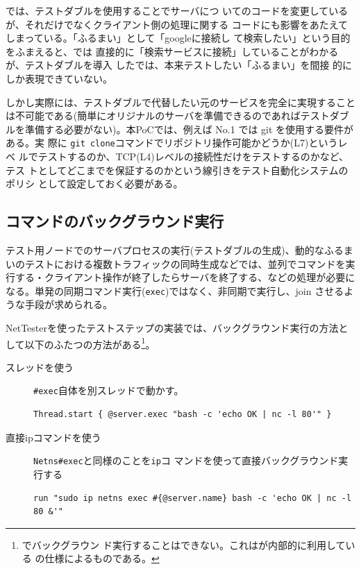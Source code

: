 では、テストダブルを使用することでサーバにつ
いてのコードを変更しているが、それだけでなくクライアント側の処理に関する
コードにも影響をあたえてしまっている。「ふるまい」として「googleに接続し
て検索したい」という目的をふまえると、では
直接的に「検索サービスに接続」していることがわかるが、テストダブルを導入
したでは、本来テストしたい「ふるまい」を間接
的にしか表現できていない。

しかし実際には、テストダブルで代替したい元のサービスを完全に実現すること
は不可能である(簡単にオリジナルのサーバを準備できるのであればテストダブ
ルを準備する必要がない)。本PoCでは、例えば
 No.1 では git を使用する要件がある。実
際に \verb|git clone|コマンドでリポジトリ操作可能かどうか(L7)というレベ
ルでテストするのか、TCP(L4)レベルの接続性だけをテストするのかなど、テス
トとしてどこまでを保証するのかという線引きをテスト自動化システムのポリシ
として設定しておく必要がある。

  \subsection{コマンドのバックグラウンド実行}
  \label{sec:background-exec-method}

テスト用ノードでのサーバプロセスの実行(テストダブルの生成)、動的なふるま
いのテストにおける複数トラフィックの同時生成などでは、並列でコマンドを実
行する・クライアント操作が終了したらサーバを終了する、などの処理が必要に
なる。単発の同期コマンド実行(\verb|exec|)ではなく、非同期で実行し、join
させるような手段が求められる。

NetTesterを使ったテストステップの実装では、バックグラウンド実行の方法と
して以下のふたつの方法がある\footnote{でバックグラウン
ド実行することはできない。これはが内部的に利用している
の仕様によるものである。}。
\begin{description}
 \item[スレッドを使う] \verb|#exec|自体を別スレッドで動かす。
\begin{lstlisting}
Thread.start { @server.exec "bash -c 'echo OK | nc -l 80'" }
\end{lstlisting}
 \item[直接ipコマンドを使う] \verb|Netns#exec|と同様のことを\verb|ip|コ
            マンドを使って直接バックグラウンド実行する
\begin{lstlisting}
run "sudo ip netns exec #{@server.name} bash -c 'echo OK | nc -l 80 &'"
\end{lstlisting}
\end{description}

